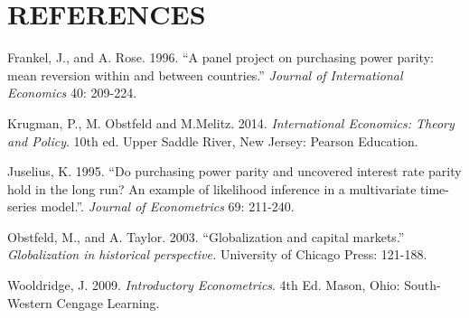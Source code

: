 \documentclass{sig-alternate-05-2015}
\begin{document}
\newenvironment{hangref}{\begin{list}{}{\setlength{\itemsep}{0pt}
\setlength{\parsep}{0pt}\setlength{\rightmargin}{0pt}
\setlength{\leftmargin}{+\parindent}
\setlength{\itemindent}{-\parindent}}}{\end{list}}
\section*{REFERENCES}
\begin{hangref}

\item Frankel, J., and A. Rose. 1996.
``A panel project on purchasing power parity: mean reversion within and between countries.''
{\it Journal of International Economics} 40: 209-224.

\item Krugman, P., M. Obstfeld and M.Melitz.  2014.
{\it International Economics: Theory and Policy}. 10th ed.
Upper Saddle River, New Jersey: Pearson Education.

\item Juselius, K. 1995.
``Do purchasing power parity and uncovered interest rate parity hold in the long run? An example of likelihood inference in a multivariate time-series model.''.
{\it Journal of Econometrics} 69: 211-240.

\item Obstfeld, M., and A. Taylor. 2003.
``Globalization and capital markets.'' 
{\it Globalization in historical perspective.}
University of Chicago Press: 121-188.

\item Wooldridge, J. 2009.
{\it Introductory Econometrics}. 4th Ed.
Mason, Ohio: South-Western Cengage Learning.





\end{hangref}

\clearpage
\end{document}
